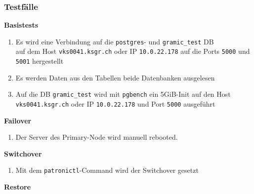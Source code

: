 
\begin{flushleft}
    \subsubsection{Testfälle}
    \begin{description}
        \item \textbf{Basistests}\hfill \\
        \begin{enumerate}
            \item Es wird eine Verbindung auf die \texttt{postgres}- und \texttt{gramic\_test} DB\\ auf dem Host \texttt{vks0041.ksgr.ch} oder IP \texttt{10.0.22.178} auf die Ports \texttt{5000} und \texttt{5001} hergestellt
            \item Es werden Daten aus den Tabellen beide Datenbanken ausgelesen
            \item Auf die DB \texttt{gramic\_test} wird mit \texttt{pgbench} ein 5GiB-Init auf den Host \texttt{vks0041.ksgr.ch} oder IP \texttt{10.0.22.178} und Port \texttt{5000} ausgeführt
        \end{enumerate}
        \item \textbf{Failover}\hfill \\
        \begin{enumerate}[resume]
            \item Der Server des Primary-Node wird manuell rebooted.
        \end{enumerate}
        \item \textbf{Switchover}\hfill \\
        \begin{enumerate}[resume]
            \item Mit dem \texttt{patronictl}-Command wird der Switchover gesetzt
        \end{enumerate}
        \item \textbf{Restore}\hfill \\

\end{description}
\end{flushleft}
